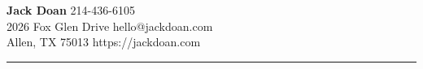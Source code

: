 \textbf{\Large Jack Doan}
\hfill
214-436-6105\\
2026 Fox Glen Drive
\hfill
hello@jackdoan.com \\
Allen, TX 75013
\hfill
https://jackdoan.com \\
\textcolor[RGB]{200,200,200}{\rule{\linewidth}{0.2pt}}

\vspace{0.5em}
